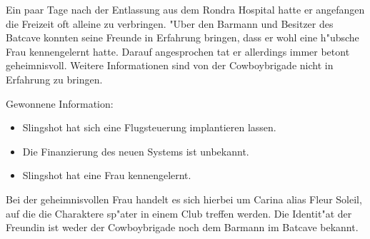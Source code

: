 Ein paar Tage nach der Entlassung aus dem Rondra Hospital hatte er angefangen die Freizeit oft alleine zu verbringen. "Uber den Barmann und Besitzer des Batcave konnten seine Freunde in Erfahrung bringen, dass er wohl eine h"ubsche Frau kennengelernt hatte. Darauf angesprochen tat er allerdings immer betont geheimnisvoll. Weitere Informationen sind von der Cowboybrigade nicht in Erfahrung zu bringen.

\begin{remarks}
	Gewonnene Information: 

	\begin{itemize}
		\item Slingshot hat sich eine Flugsteuerung implantieren lassen.
		\item Die Finanzierung des neuen Systems ist unbekannt.
		\item Slingshot hat eine Frau kennengelernt.
	\end{itemize}
	
	Bei der geheimnisvollen Frau handelt es sich hierbei um Carina alias Fleur Soleil, auf die die Charaktere sp"ater in einem Club treffen werden. Die Identit"at der Freundin ist weder der Cowboybrigade noch dem Barmann im Batcave bekannt.
\end{remarks}

